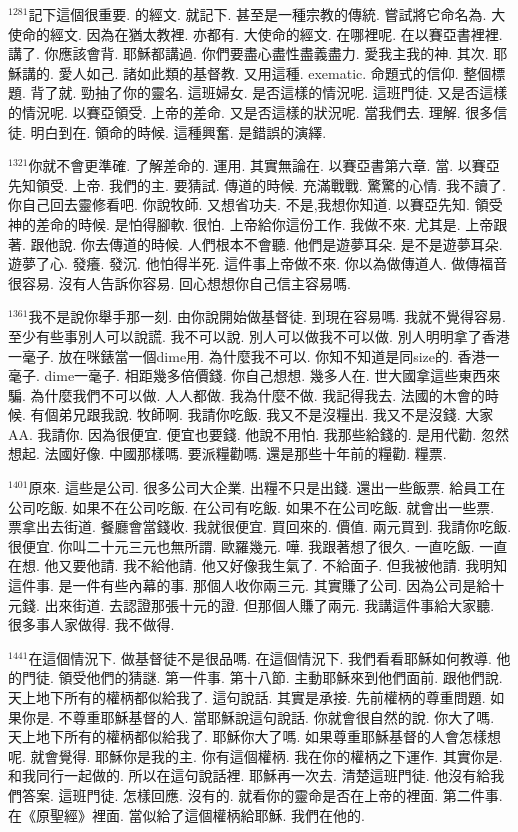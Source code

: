 \documentclass{book}
\begin{document}
$^{1281}$記下這個很重要.
的經文.
就記下.
甚至是一種宗教的傳統.
嘗試將它命名為.
大使命的經文.
因為在猶太教裡.
亦都有.
大使命的經文.
在哪裡呢.
在以賽亞書裡裡.
講了.
你應該會背.
耶穌都講過.
你們要盡心盡性盡義盡力.
愛我主我的神.
其次.
耶穌講的.
愛人如己.
諸如此類的基督教.
又用這種.
exematic.
命題式的信仰.
整個標題.
背了就.
勁抽了你的靈名.
這班婦女.
是否這樣的情況呢.
這班門徒.
又是否這樣的情況呢.
以賽亞領受.
上帝的差命.
又是否這樣的狀況呢.
當我們去.
理解.
很多信徒.
明白到在.
領命的時候.
這種興奮.
是錯誤的演繹.

$^{1321}$你就不會更準確.
了解差命的.
運用.
其實無論在.
以賽亞書第六章.
當.
以賽亞先知領受.
上帝.
我們的主.
要猜試.
傳道的時候.
充滿戰戰.
驚驚的心情.
我不讀了.
你自己回去靈修看吧.
你說牧師.
又想省功夫.
不是,我想你知道.
以賽亞先知.
領受神的差命的時候.
是怕得腳軟.
很怕.
上帝給你這份工作.
我做不來.
尤其是.
上帝跟著.
跟他說.
你去傳道的時候.
人們根本不會聽.
他們是遊夢耳朵.
是不是遊夢耳朵.
遊夢了心.
發癢.
發沉.
他怕得半死.
這件事上帝做不來.
你以為做傳道人.
做傳福音很容易.
沒有人告訴你容易.
回心想想你自己信主容易嗎.

$^{1361}$我不是說你舉手那一刻.
由你說開始做基督徒.
到現在容易嗎.
我就不覺得容易.
至少有些事別人可以說謊.
我不可以說.
別人可以做我不可以做.
別人明明拿了香港一毫子.
放在咪錶當一個dime用.
為什麼我不可以.
你知不知道是同size的.
香港一毫子.
dime一毫子.
相距幾多倍價錢.
你自己想想.
幾多人在.
世大國拿這些東西來騙.
為什麼我們不可以做.
人人都做.
我為什麼不做.
我記得我去.
法國的木會的時候.
有個弟兄跟我說.
牧師啊.
我請你吃飯.
我又不是沒糧出.
我又不是沒錢.
大家AA.
我請你.
因為很便宜.
便宜也要錢.
他說不用怕.
我那些給錢的.
是用代勸.
忽然想起.
法國好像.
中國那樣嗎.
要派糧勸嗎.
還是那些十年前的糧勸.
糧票.

$^{1401}$原來.
這些是公司.
很多公司大企業.
出糧不只是出錢.
還出一些飯票.
給員工在公司吃飯.
如果不在公司吃飯.
在公司有吃飯.
如果不在公司吃飯.
就會出一些票.
票拿出去街道.
餐廳會當錢收.
我就很便宜.
買回來的.
價值.
兩元買到.
我請你吃飯.
很便宜.
你叫二十元三元也無所謂.
歐羅幾元.
嘩.
我跟著想了很久.
一直吃飯.
一直在想.
他又要他請.
我不給他請.
他又好像我生氣了.
不給面子.
但我被他請.
我明知這件事.
是一件有些內幕的事.
那個人收你兩三元.
其實賺了公司.
因為公司是給十元錢.
出來街道.
去認證那張十元的證.
但那個人賺了兩元.
我講這件事給大家聽.
很多事人家做得.
我不做得.

$^{1441}$在這個情況下.
做基督徒不是很品嗎.
在這個情況下.
我們看看耶穌如何教導.
他的門徒.
領受他們的猜謎.
第一件事.
第十八節.
主動耶穌來到他們面前.
跟他們說.
天上地下所有的權柄都似給我了.
這句說話.
其實是承接.
先前權柄的尊重問題.
如果你是.
不尊重耶穌基督的人.
當耶穌說這句說話.
你就會很自然的說.
你大了嗎.
天上地下所有的權柄都似給我了.
耶穌你大了嗎.
如果尊重耶穌基督的人會怎樣想呢.
就會覺得.
耶穌你是我的主.
你有這個權柄.
我在你的權柄之下運作.
其實你是.
和我同行一起做的.
所以在這句說話裡.
耶穌再一次去.
清楚這班門徒.
他沒有給我們答案.
這班門徒.
怎樣回應.
沒有的.
就看你的靈命是否在上帝的裡面.
第二件事.
在《原聖經》裡面.
當似給了這個權柄給耶穌.
我們在他的.
\end{document}
